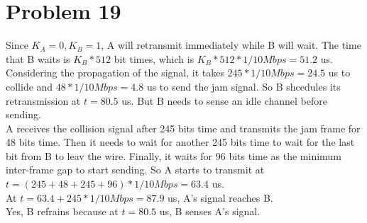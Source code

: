 \documentclass[titlepage, paper=a4, fontsize=11pt]{scrartcl} %
\numberwithin{equation}{section} %
\numberwithin{table}{section} %
\begin{document}

\section*{Problem 19}
Since $K_A=0, K_B=1$, A will retransmit immediately while B will wait. The time that B waits is $K_B*512$ bit times, which is $K_B*512*1/10Mbps=51.2$ us. Considering the propagation of the signal, it takes $245*1/10Mbps=24.5$ us to collide and $48*1/10Mbps=4.8$ us to send the jam signal. So B shcedules its retransmission at $t=80.5$ us. But B needs to sense an idle channel before sending. \\

A receives the collision signal after 245 bits time and transmits the jam frame for 48 bits time. Then it needs to wait for another 245 bits time to wait for the last bit from B to leav the wire. Finally, it waits for 96 bits time as the minimum inter-frame gap to start sending. So A starts to transmit at $t=(245+48+245+96)*1/10Mbps=63.4$ us. \\

At $t=63.4+245*1/10Mbps=87.9$ us, A's signal reaches B. \\

Yes, B refrains because at $t=80.5$ us, B senses A's signal.
\end{document}
